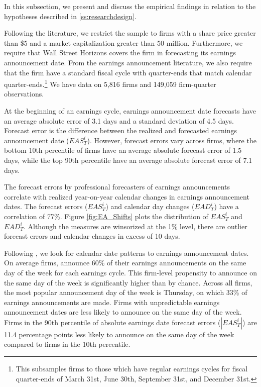 \documentclass[ecta,nameyear,draft]{econsocart}
\theoremstyle{theorem}
\numberwithin{lemma}{section}
\numberwithin{proposition}{section}
\numberwithin{equation}{section}
\numberwithin{figure}{section}
\begin{document}
In this subsection, we present and discuss the empirical findings in relation to the hypotheses described in \ref{ss:researchdesign}. 

Following the literature, we restrict the sample to firms with a share price greater than \$5 and a market capitalization greater than 50 million. Furthermore, we require that Wall Street Horizons covers the firm in forecasting its earnings announcement date. From the earnings announcement literature, we also require that the firm have a standard fiscal cycle with quarter-ends that match calendar quarter-ends.\footnote{This subsamples firms to those which have regular earnings cycles for fiscal quarter-ends of March 31st, June 30th, September 31st, and December 31st.} We have data on 5,816 firms and 149,059 firm-quarter observations.

At the beginning of an earnings cycle, earnings announcement date forecasts have an average absolute error of 3.1 days and a standard deviation of 4.5 days. Forecast error is the difference between the realized and forecasted earnings announcement date ($EAS^{i}_{T}$). However, forecast errors vary across firms, where the bottom 10th percentile of firms have an average absolute forecast error of 1.5 days, while the top 90th percentile have an average absolute forecast error of 7.1 days. 

The forecast errors by professional forecasters of earnings announcements correlate with realized year-on-year calendar changes in earnings announcement dates. The forecast errors ($EAS^{i}_{T}$) and calendar day changes ($EAD^{i}_{T}$) have a correlation of 77\%. Figure \ref{fig:EA_Shifts} plots the distribution of $EAS^{i}_{T}$ and $EAD^{i}_{T}$. Although the measures are winsorized at the 1\% level, there are outlier forecast errors and calendar changes in excess of 10 days. 

Following \cite{noh2021calendar}, we look for calendar date patterns to earnings announcement dates. On average firms, announce 60\% of their earnings announcements on the same day of the week for each earnings cycle. This firm-level propensity to announce on the same day of the week is significantly higher than by chance. Across all firms, the most popular announcement day of the week is Thursday, on which 33\% of earnings announcements are made. Firms with unpredictable earnings announcement dates are less likely to announce on the same day of the week. Firms in the 90th percentile of absolute earnings date forecast errors ($|EAS^{i}_{T}|$) are 11.4 percentage points less likely to announce on the same day of the week compared to firms in the 10th percentile. 
\end{document}
